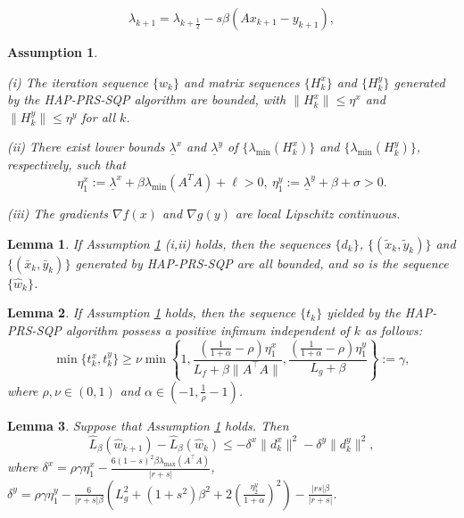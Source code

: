 \documentclass[10pt,a4paper]{amsart}
\newtheorem{lemma}{Lemma}
\newtheorem{assumption}{Assumption}
\begin{document}
\begin{equation}\label{lambda2}
\lambda_{k+1} = \lambda_{k+\frac{1}{2}}-s \beta(A x_{k+1}-y_{k+1}),
\end{equation}

\begin{assumption}\label{ass1}{\rm
		
		(i) The iteration sequence $\{w_k\}$ and matrix sequences $\{{H}_k^x\}$ and $\{{H}_k^y\}$ generated by the HAP-PRS-SQP algorithm are bounded, with $\|{H}_k^x\|\leq \eta^x$ and $\|{H}_k^y\|\leq \eta^y$ for all $k$.
		
		(ii) There exist lower bounds $\underline{\lambda}^x$ and $\underline{\lambda}^y$ of $\{\lambda_{\min}(H^x_k)\}$ and $\{\lambda_{\min}(H^y_k)\}$, respectively, such that
		\begin{equation}\label{NF01} \eta^x_1:=\underline{\lambda}^x+\beta\lambda_{\min}(A^TA)+\ell>0,\
			\eta^y_1:=\underline{\lambda}^y+\beta+\sigma>0.
		\end{equation}
		
		(iii) The gradients $\nabla f(x)$ and $\nabla g(y)$ are local Lipschitz continuous.
	}
\end{assumption}

\begin{lemma}\label{lemNA}
	If Assumption \ref{ass1} (i,ii) holds, then the sequences $\{d_k\}$, $\{(\tilde{x}_k,\tilde{y}_k)\}$ and $\{(\bar{x}_k,\bar{y}_k)\}$ generated by HAP-PRS-SQP are all bounded, and so is the sequence $\{\hat{w}_k\}$.
\end{lemma}

\begin{lemma}\label{lem2}
	If Assumption \ref{ass1}  holds, then the sequence $\{t_k\}$ yielded by the HAP-PRS-SQP algorithm possess a positive infimum independent of $k$ as follows:
	\[\label{stepL}
	\min \{t_k^x,t_k^y\} \geq \nu\min \left\{1,\frac{(\frac{1}{1+\alpha}-\rho)\eta_1^{x}}
	{L_f+\beta\|A^{\top}A\|},\frac{(\frac{1}{1+\alpha}-\rho)\eta_1 ^y}{L_g+\beta}\right\}:=\gamma,
	\]
	where $\rho,\nu\in (0,1)$ and $\alpha \in (-1, \frac{1}{\rho}-1)$.
\end{lemma}

\begin{lemma}\label{lem3}
	Suppose that Assumption \ref{ass1} holds. Then
	\[\hat{L}_{\beta}(\hat{w}_{k+1})-\hat{L}_{\beta}(\hat{w}_{k}) \leq -\delta^x\|d_{k}^x\|^2-\delta^y\|d_{k}^y\|^2,\]
	where $\delta^x=\rho\gamma\eta^x_1-\frac{6(1-s)^2\beta\lambda_{\max}(A^{\top}A)}{|r+s|}$, $\delta^y =\rho\gamma\eta^y_1 -\frac{6}{|r+s|\beta}\left(L_{g}^{2}+(1+s^{2})\beta^{2}+2\left(\frac{\eta_2^y}{1+\alpha}\right)^2\right)-\frac{|rs|\beta}{|r+s|}$.
\end{lemma}
\end{document}
